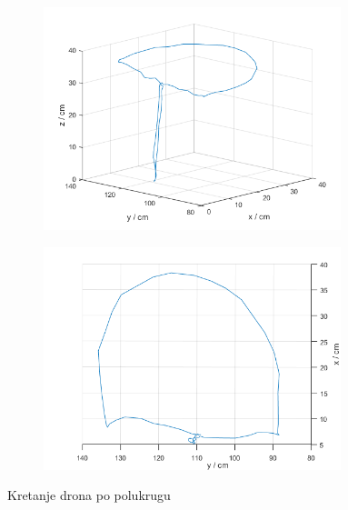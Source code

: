 \documentclass[times, utf8, diplomski]{fer}
\begin{document}
\begin{figure}[h]
\begin{subfigure}[b]{.5\textwidth}
\centering
	\includegraphics[width=0.95\textwidth]{polukrug1}
	\caption*{}
	\label{fig:krug_1}
\end{subfigure}
\begin{subfigure}[b]{.5\textwidth}
	\centering
	\includegraphics[width=0.95\textwidth]{polukrug2}
	\caption*{}
	\label{fig:krug_2}
\end{subfigure}
\caption{Kretanje drona po polukrugu}
\label{fig:krug}
\end{figure}
\end{document}
